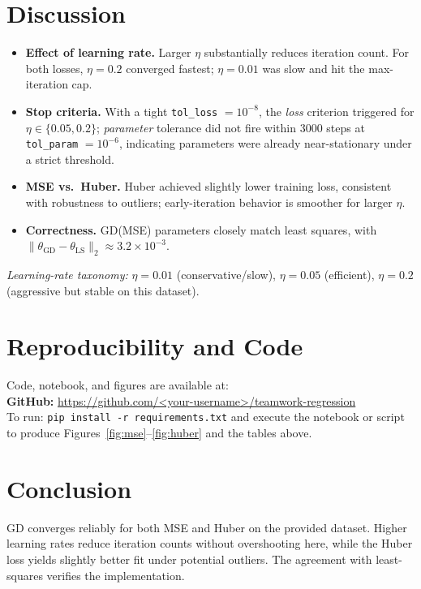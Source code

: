 \documentclass[11pt]{article}
\begin{document}
\section{Discussion}
\begin{itemize}[leftmargin=1.5em]
\item \textbf{Effect of learning rate.} Larger $\eta$ substantially reduces iteration count. For both losses, $\eta=0.2$ converged fastest; $\eta=0.01$ was slow and hit the max-iteration cap.
\item \textbf{Stop criteria.} With a tight \texttt{tol\_loss} $=10^{-8}$, the \emph{loss} criterion triggered for $\eta\in\{0.05,0.2\}$; \emph{parameter} tolerance did not fire within $3000$ steps at \texttt{tol\_param} $=10^{-6}$, indicating parameters were already near-stationary under a strict threshold.
\item \textbf{MSE vs.\ Huber.} Huber achieved slightly lower training loss, consistent with robustness to outliers; early-iteration behavior is smoother for larger $\eta$.
\item \textbf{Correctness.} GD(MSE) parameters closely match least squares, with $\|\theta_{\mathrm{GD}}-\theta_{\mathrm{LS}}\|_2\approx 3.2\times10^{-3}$.
\end{itemize}
\noindent \textit{Learning-rate taxonomy:} $\eta{=}0.01$ (conservative/slow), $\eta{=}0.05$ (efficient), $\eta{=}0.2$ (aggressive but stable on this dataset).

\section{Reproducibility and Code}
Code, notebook, and figures are available at:\\[2pt]
\textbf{GitHub:} \href{https://github.com/Jay-Sonawane2712000/EEE_511_1233750832_HW_1.git}{https://github.com/\textless your-username\textgreater/teamwork-regression}\\[3pt]
To run: \texttt{pip install -r requirements.txt} and execute the notebook or script to produce Figures~\ref{fig:mse}--\ref{fig:huber} and the tables above.

\section*{Conclusion}
GD converges reliably for both MSE and Huber on the provided dataset. Higher learning rates reduce iteration counts without overshooting here, while the Huber loss yields slightly better fit under potential outliers. The agreement with least-squares verifies the implementation.
\end{document}
